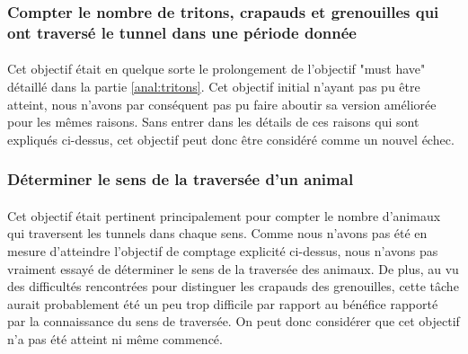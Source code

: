\subsubsection{Compter le nombre de tritons, crapauds et grenouilles qui ont traversé le tunnel dans une période donnée}
\paragraph{} Cet objectif était en quelque sorte le prolongement de l'objectif "must have" détaillé dans la partie \ref{anal:tritons}. Cet objectif initial n'ayant pas pu être atteint, nous n'avons par conséquent pas pu faire aboutir sa version améliorée pour les mêmes raisons. Sans entrer dans les détails de ces raisons qui sont expliqués ci-dessus, cet objectif peut donc être considéré comme un nouvel échec.

\subsubsection{Déterminer le sens de la traversée d’un animal}
\paragraph{} Cet objectif était pertinent principalement pour compter le nombre d'animaux qui traversent les tunnels dans chaque sens. Comme nous n'avons pas été en mesure d'atteindre l'objectif de comptage explicité ci-dessus, nous n'avons pas vraiment essayé de déterminer le sens de la traversée des animaux. De plus, au vu des difficultés rencontrées pour distinguer les crapauds des grenouilles, cette tâche aurait probablement été un peu trop difficile par rapport au bénéfice rapporté par la connaissance du sens de traversée. On peut donc considérer que cet objectif n'a pas été atteint ni même commencé.

